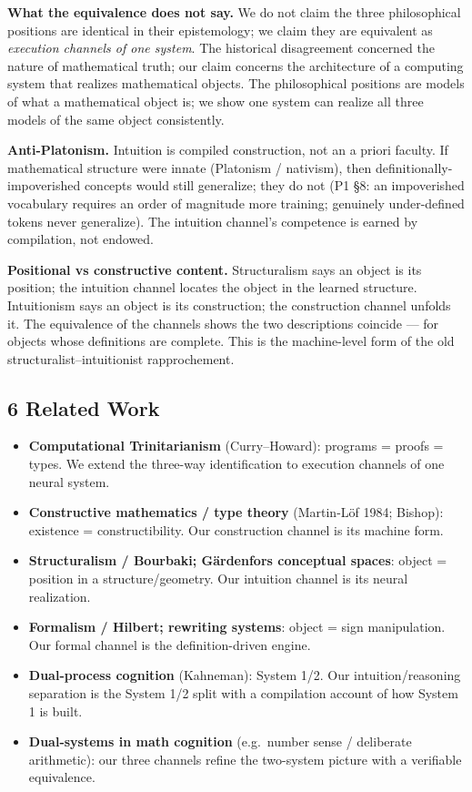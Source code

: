 \documentclass[
]{article}
\providecommand{\tightlist}{%
  \setlength{\itemsep}{0pt}\setlength{\parskip}{0pt}}
\begin{document}
\textbf{What the equivalence does not say.} We do not claim the three
philosophical positions are identical in their epistemology; we claim
they are equivalent as \emph{execution channels of one system}. The
historical disagreement concerned the nature of mathematical truth; our
claim concerns the architecture of a computing system that realizes
mathematical objects. The philosophical positions are models of what a
mathematical object is; we show one system can realize all three models
of the same object consistently.

\textbf{Anti-Platonism.} Intuition is compiled construction, not an a
priori faculty. If mathematical structure were innate (Platonism /
nativism), then definitionally-impoverished concepts would still
generalize; they do not (P1 §8: an impoverished vocabulary requires an
order of magnitude more training; genuinely under-defined tokens never
generalize). The intuition channel's competence is earned by
compilation, not endowed.

\textbf{Positional vs constructive content.} Structuralism says an
object is its position; the intuition channel locates the object in the
learned structure. Intuitionism says an object is its construction; the
construction channel unfolds it. The equivalence of the channels shows
the two descriptions coincide --- for objects whose definitions are
complete. This is the machine-level form of the old
structuralist--intuitionist rapprochement.

\subsection{6 Related Work}\label{related-work}

\begin{itemize}
\tightlist
\item
  \textbf{Computational Trinitarianism} (Curry--Howard): programs =
  proofs = types. We extend the three-way identification to execution
  channels of one neural system.
\item
  \textbf{Constructive mathematics / type theory} (Martin-Löf 1984;
  Bishop): existence = constructibility. Our construction channel is its
  machine form.
\item
  \textbf{Structuralism / Bourbaki; Gärdenfors conceptual spaces}:
  object = position in a structure/geometry. Our intuition channel is
  its neural realization.
\item
  \textbf{Formalism / Hilbert; rewriting systems}: object = sign
  manipulation. Our formal channel is the definition-driven engine.
\item
  \textbf{Dual-process cognition} (Kahneman): System 1/2. Our
  intuition/reasoning separation is the System 1/2 split with a
  compilation account of how System 1 is built.
\item
  \textbf{Dual-systems in math cognition} (e.g.~number sense /
  deliberate arithmetic): our three channels refine the two-system
  picture with a verifiable equivalence.
\end{itemize}
\end{document}
